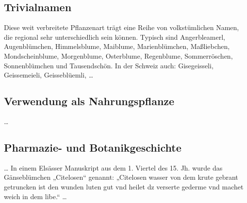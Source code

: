 \documentclass[11pt]{article}
\begin{document}
    \subsection{Trivialnamen}
    Diese weit verbreitete Pflanzenart trägt eine Reihe von volkstümlichen Namen, die regional sehr unterschiedlich sein können. Typisch sind Angerbleamerl, Augenblümchen, Himmelsblume, Maiblume, Marienblümchen, Maßliebchen, Mondscheinblume, Morgenblume, Osterblume, Regenblume, Sommerröschen,\cite{6} Sonnenblümchen und Tausendschön. In der Schweiz auch: Gisegeisseli, Geissemeieli, Geisseblüemli,\cite{7} \dots
    
    \subsection{Verwendung als Nahrungspflanze}
	\dots 
	
	\subsection{Pharmazie- und Botanikgeschichte}
	\dots 
	In einem Elsässer Manuskript aus dem 1. Viertel des 15. Jh. wurde das Gänseblümchen „Citelosen“ genannt: „Citelosen wasser von dem krute gebrant getruncken ist den wunden luten gut vnd heilet dz verserte gederme vnd machet weich in dem libe.“\cite{13}
	\dots 
	
	


\end{document}
